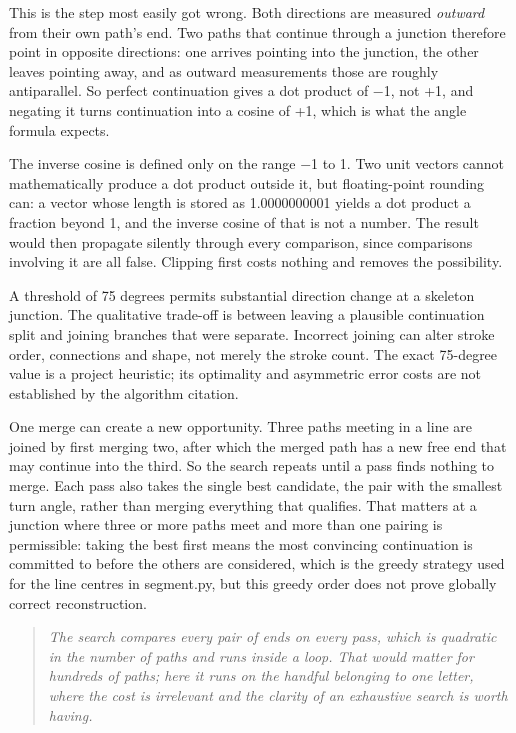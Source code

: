 This is the step most easily got wrong. Both directions are measured \emph{outward} from their own path's end. Two paths that continue through a junction therefore point in opposite directions: one arrives pointing into the junction, the other leaves pointing away, and as outward measurements those are roughly antiparallel. So perfect continuation gives a dot product of $-$1, not +1, and negating it turns continuation into a cosine of +1, which is what the angle formula expects.


The inverse cosine is defined only on the range $-$1 to 1. Two unit vectors cannot mathematically produce a dot product outside it, but floating-point rounding can: a vector whose length is stored as 1.0000000001 yields a dot product a fraction beyond 1, and the inverse cosine of that is not a number. The result would then propagate silently through every comparison, since comparisons involving it are all false. Clipping first costs nothing and removes the possibility.


A threshold of 75 degrees permits substantial direction change at a skeleton junction. The qualitative trade-off is between leaving a plausible continuation split and joining branches that were separate. Incorrect joining can alter stroke order, connections and shape, not merely the stroke count. The exact 75-degree value is a project heuristic; its optimality and asymmetric error costs are not established by the algorithm citation.


One merge can create a new opportunity. Three paths meeting in a line are joined by first merging two, after which the merged path has a new free end that may continue into the third. So the search repeats until a pass finds nothing to merge. Each pass also takes the single best candidate, the pair with the smallest turn angle, rather than merging everything that qualifies. That matters at a junction where three or more paths meet and more than one pairing is permissible: taking the best first means the most convincing continuation is committed to before the others are considered, which is the greedy strategy used for the line centres in segment.py, but this greedy order does not prove globally correct reconstruction.


\begin{quote}\small\itshape The search compares every pair of ends on every pass, which is quadratic in the number of paths and runs inside a loop. That would matter for hundreds of paths; here it runs on the handful belonging to one letter, where the cost is irrelevant and the clarity of an exhaustive search is worth having.\end{quote}


